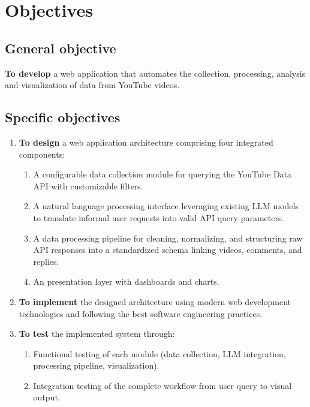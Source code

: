 \section{Objectives}
\label{chap:objectives}

\subsection{General objective}

\textbf{To develop} a web application that automates the collection, processing, analysis and visualization of data from YouTube videos.

\subsection{Specific objectives}

\begin{enumerate}
	\item \label{obj:design} \textbf{To design} a web application architecture comprising four integrated components:

		\begin{enumerate}
			\item A configurable data collection module for querying the YouTube Data API with customizable filters.

			\item A natural language processing interface leveraging existing LLM models to translate informal user requests into valid API query parameters.

			\item A data processing pipeline for cleaning, normalizing, and structuring raw API responses into a standardized schema linking videos, comments, and replies.

			\item An presentation layer with dashboards and charts.
		\end{enumerate}

	\item \label{obj:implement} \textbf{To implement} the designed architecture using modern web development technologies and following the best software engineering practices.

	\item \label{obj:test} \textbf{To test} the implemented system through:

		\begin{enumerate}
			\item Functional testing of each module (data collection, LLM integration, processing pipeline, visualization).

			\item Integration testing of the complete workflow from user query to visual output.
		\end{enumerate}
\end{enumerate}

